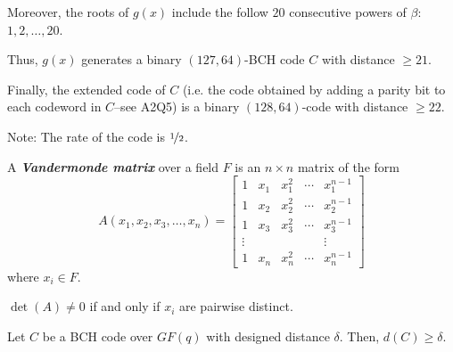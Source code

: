 \begin{exbox}
\begin{example}
        Moreover, the roots of $ g(x) $ include the follow $ 20 $
        consecutive powers of $ \beta $: $ 1,2,\ldots ,20 $.

        Thus, $ g(x) $ generates a binary $ (127,64) $-BCH code
        $ C $ with distance $ \geqslant 21 $.

        Finally, the extended code of $ C $ (i.e. the code obtained
        by adding a parity bit to each codeword in $ C $--see A2Q5) is
        a binary $ (128,64) $-code with distance $ \geqslant 22 $.

        Note: The rate of the code is $ \nicefrac{1}{2} $.
    \end{example}
\end{exbox}

\begin{defbox}
    \begin{definition}
        A \textbf{\emph{Vandermonde matrix}} over a field $ F $ is an
        $ n\times n $ matrix of the form
        \[ A\left(x_{1}, x_{2}, x_{3}, \ldots, x_{n}\right)=\left[\begin{array}{ccccc}
                    1      & x_{1} & x_{1}^{2} & \cdots & x_{1}^{n-1} \\
                    1      & x_{2} & x_{2}^{2} & \cdots & x_{2}^{n-1} \\
                    1      & x_{3} & x_{3}^{2} & \cdots & x_{3}^{n-1} \\
                    \vdots &       &           &        & \vdots      \\
                    1      & x_{n} & x_{n}^{2} & \cdots & x_{n}^{n-1}
                \end{array}\right] \]
        where $ x_i\in F $.
    \end{definition}
\end{defbox}

\begin{thmbox}
    \begin{theorem}
        $ \det(A)\neq 0 $ if and only if $ x_i $ are pairwise distinct.
    \end{theorem}
\end{thmbox}

\begin{thmbox}
    \begin{theorem}
        Let $ C $ be a BCH code over $ GF(q) $ with designed
        distance $ \delta $. Then, $ d(C)\geqslant \delta $.
    \end{theorem}
\end{thmbox}

